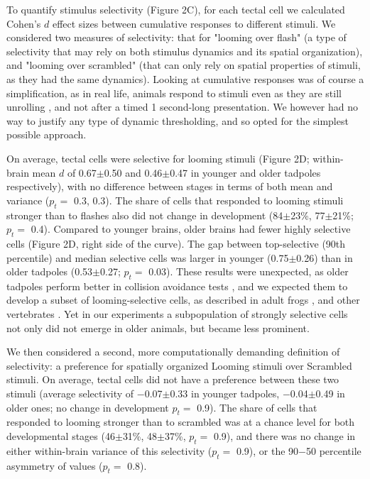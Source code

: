\documentclass{article}
\begin{document}
To quantify stimulus selectivity (Figure 2C), for each tectal cell we calculated Cohen’s $d$ effect sizes between cumulative responses to different stimuli. We considered two measures of selectivity: that for "looming over flash" (a type of selectivity that may rely on both stimulus dynamics and its spatial organization), and "looming over scrambled" (that can only rely on spatial properties of stimuli, as they had the same dynamics). Looking at cumulative responses was of course a simplification, as in real life, animals respond to stimuli even as they are still unrolling \citep{peron2009adaptation, khakhalin2014}, and not after a timed 1 second-long presentation. We however had no way to justify any type of dynamic thresholding, and so opted for the simplest possible approach.

On average, tectal cells were selective for looming stimuli (Figure 2D; within-brain mean $d$ of 0.67$\pm$0.50 and 0.46$\pm$0.47 in younger and older tadpoles respectively), with no difference between stages in terms of both mean and variance ($p_t=$ 0.3, 0.3). The share of cells that responded to looming stimuli stronger than to flashes also did not change in development (84$\pm$23\%, 77$\pm$21\%; $p_t=$ 0.4). Compared to younger brains, older brains had fewer highly selective cells (Figure 2D, right side of the curve). The gap between top-selective (90th percentile) and median selective cells was larger in younger (0.75$\pm$0.26) than in older tadpoles (0.53$\pm$0.27; $p_t=$ 0.03). These results were unexpected, as older tadpoles perform better in collision avoidance tests \citep{dong2009}, and we expected them to develop a subset of looming-selective cells, as described in adult frogs \citep{nakagawa2010otneurons, baranauskas2012}, and other vertebrates \citep{wang1992pigeon, wu2005pigeon, liu2011cat}. Yet in our experiments a subpopulation of strongly selective cells not only did not emerge in older animals, but became less prominent.

We then considered a second, more computationally demanding definition of selectivity: a preference for spatially organized Looming stimuli over Scrambled stimuli. On average, tectal cells did not have a preference between these two stimuli (average selectivity of $-$0.07$\pm$0.33 in younger tadpoles, $-$0.04$\pm$0.49 in older ones; no change in development $p_t=$ 0.9). The share of cells that responded to looming stronger than to scrambled was at a chance level for both developmental stages (46$\pm$31\%, 48$\pm$37\%, $p_t=$ 0.9), and there was no change in either within-brain variance of this selectivity ($p_t=$ 0.9), or the 90$-$50 percentile asymmetry of values ($p_t=$ 0.8).
\end{document}
